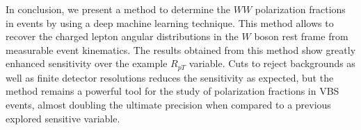 In conclusion, we present a method to determine the $WW$ polarization fractions in
\ssWW events by using a deep machine learning technique.  This method
allows to recover the charged lepton angular distributions in the $W$
boson rest frame from measurable event kinematics.  The
results obtained from this method show greatly enhanced sensitivity over
the example $R_{pT}$ variable.  Cuts to reject
backgrounds as well as finite detector resolutions reduces the sensitivity as
expected, but the method remains a powerful tool for the study of
polarization fractions in VBS events, almost doubling the ultimate precision when compared to a previous explored sensitive variable.


%

\begin{thebibliography}{99}

\end{thebibliography}

